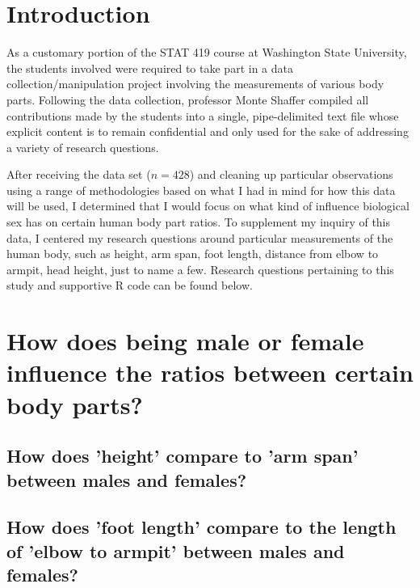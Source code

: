 \documentclass[]{article}
\begin{document}
\vskip -8.5pt




\noindent  

\section{Introduction}
\label{sec:intro}

As a customary portion of the STAT 419 course at Washington State
University, the students involved were required to take part in a data
collection/manipulation project involving the measurements of various
body parts. Following the data collection, professor Monte Shaffer
compiled all contributions made by the students into a single,
pipe-delimited text file whose explicit content is to remain
confidential and only used for the sake of addressing a variety of
research questions.

\vspace{0.25cm}

After receiving the data set (\(n=428\)) and cleaning up particular
observations using a range of methodologies based on what I had in mind
for how this data will be used, I determined that I would focus on what
kind of influence biological sex has on certain human body part ratios.
To supplement my inquiry of this data, I centered my research questions
around particular measurements of the human body, such as height, arm
span, foot length, distance from elbow to armpit, head height, just to
name a few. Research questions pertaining to this study and supportive R
code can be found below.

\section{How does being male or female influence the ratios between certain body parts?}
\label{sec:rq}

\subsection{How does 'height' compare to 'arm span' between males and females?}
\label{sec:rq2}

\subsection{How does 'foot length' compare to the length of 'elbow to armpit' between males and females?}
\label{sec:rq3}
\end{document}
